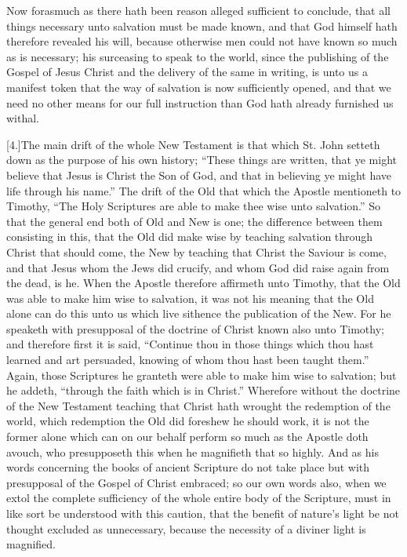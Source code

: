Now forasmuch as there hath been reason alleged sufficient to conclude, that all things necessary unto salvation must be made known, and that God himself hath therefore revealed his will, because otherwise men could not have known so much as is necessary; his surceasing to speak to the world, since the publishing of the Gospel of Jesus Christ and the delivery of the same in writing, is unto us a manifest token that the way of salvation is now sufficiently opened, and that we need no other means for our full instruction than God hath already furnished us withal.

[4.]The main drift of the whole New Testament is that which St. John setteth down as the purpose of his own history; “These things are written, that ye might believe that Jesus is Christ the Son of God, and that in believing ye might have life through his name.” The drift of the Old that which the Apostle mentioneth to Timothy, “The Holy Scriptures are able to make thee wise unto salvation.” So that the general end both of Old and New is one; the difference between them consisting in this, that the Old did make wise by teaching salvation through Christ that should come, the New by teaching that Christ the Saviour is come, and that Jesus whom the Jews did crucify, and whom God did raise again from the dead, is he. When the Apostle therefore affirmeth unto Timothy, that the Old was able to make him wise to salvation, it was not his meaning that the Old alone can do this unto us which live sithence the publication of the New. For he speaketh with presupposal of the doctrine of Christ known also unto Timothy; and therefore first it is said, “Continue thou in those things which thou hast learned and art persuaded, knowing of whom thou hast been taught them.” Again, those Scriptures  he granteth were able to make him wise to salvation; but he addeth, “through the faith which is in Christ.” Wherefore without the doctrine of the New Testament teaching that Christ hath wrought the redemption of the world, which redemption the Old did foreshew he should work, it is not the former alone which can on our behalf perform so much as the Apostle doth avouch, who presupposeth this when he magnifieth that so highly. And as his words concerning the books of ancient Scripture do not take place but with presupposal of the Gospel of Christ embraced; so our own words also, when we extol the complete sufficiency of the whole entire body of the Scripture, must in like sort be understood with this caution, that the benefit of nature’s light be not thought excluded as unnecessary, because the necessity of a diviner light is magnified.

